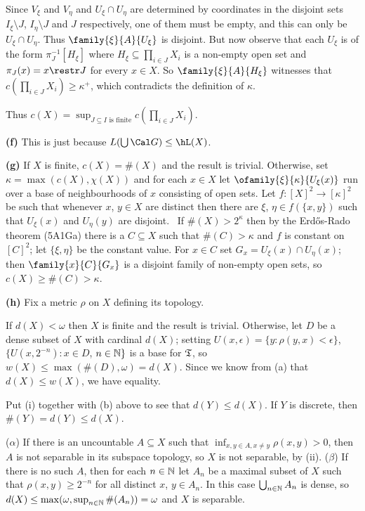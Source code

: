 {

\noindent Since $V_{\xi}$ and $V_{\eta}$ and $U_{\xi}\cap U_{\eta}$ are
determined by coordinates in the disjoint sets $I_{\xi}\setminus J$,
$I_{\eta}\setminus J$ and $J$ respectively, one of them must be empty,
and this can only be $U_{\xi}\cap U_{\eta}$.   Thus
$\family{\xi}{A}{U_{\xi}}$ is disjoint.   But now observe that each
$U_{\xi}$ is of the form $\pi_J^{-1}[H_{\xi}]$ where
$H_{\xi}\subseteq\prod_{i\in J}X_i$ is a non-empty open set and
$\pi_J(x)=x\restr J$ for every $x\in X$.   So $\family{\xi}{A}{H_{\xi}}$
witnesses that $c(\prod_{i\in J}X_i)\ge\kappa^+$, which contradicts the
definition of $\kappa$.\ \Bang

Thus $c(X)=\sup_{J\subseteq I\text{ is finite}}c(\prod_{i\in J}X_i)$.

\medskip

{\bf (f)} This is just because $L(\bigcup\Cal G)\le\hL(X)$.

\medskip

{\bf (g)} If $X$ is finite, $c(X)=\#(X)$ and the result is trivial.
Otherwise, set $\kappa=\max(c(X),\chi(X))$ and for each $x\in X$ let
$\ofamily{\xi}{\kappa}{U_{\xi}(x)}$ run over a base of neighbourhoods of
$x$ consisting of open sets.   Let $f:[X]^2\to[\kappa]^2$ be such that
whenever $x$, $y\in X$ are distinct then there are $\xi$,
$\eta\in f(\{x,y\})$ such that $U_{\xi}(x)$ and $U_{\eta}(y)$ are disjoint.
\Quer\ If $\#(X)>2^{\kappa}$ then by the Erd\H{o}s-Rado theorem
(5A1Ga) there is a $C\subseteq X$ such that $\#(C)>\kappa$ and $f$ is
constant on $[C]^2$;  let $\{\xi,\eta\}$ be the constant value.
For $x\in C$ set $G_x=U_{\xi}(x)\cap U_{\eta}(x)$;  then
$\family{x}{C}{G_x}$ is a disjoint family of non-empty open sets, so
$c(X)\ge\#(C)>\kappa$.\ \Bang

\medskip

{\bf (h)} Fix a metric $\rho$ on $X$ defining its topology.

\medskip

 If $d(X)<\omega$ then $X$ is finite and the result is
trivial.
Otherwise, let $D$ be a dense subset of $X$ with cardinal $d(X)$;
setting $U(x,\epsilon)=\{y:\rho(y,x)<\epsilon\}$,
$\{U(x,2^{-n}):x\in D$, $n\in\Bbb N\}$ is a base for $\frak T$, so
$w(X)\le\max(\#(D),\omega)=d(X)$.   Since we know from (a) that
$d(X)\le w(X)$, we have equality.

\medskip

 Put (i) together with (b) above to see that $d(Y)\le d(X)$.
If $Y$ is discrete, then $\#(Y)=d(Y)\le d(X)$.

\medskip

($\alpha$) If there is an uncountable $A\subseteq X$ such
that $\inf_{x,y\in A,x\ne y}\rho(x,y)>0$, then $A$ is not separable in its
subspace topology, so $X$ is not separable, by (ii).
($\beta$) If there is no such $A$, then
for each $n\in\Bbb N$ let $A_n$ be a maximal subset of
$X$ such that $\rho(x,y)\ge 2^{-n}$ for all distinct $x$, $y\in A_n$.
In this case $\bigcup_{n\in\Bbb N}A_n$ is dense, so
$d(X)\le\max(\omega,\sup_{n\in\Bbb N}\#(A_n))=\omega$ and $X$ is separable.
}%

